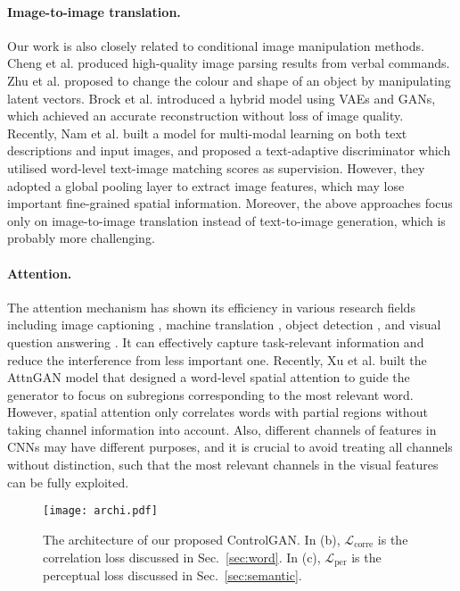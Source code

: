 \documentclass{article}
\begin{document}
\paragraph{Image-to-image translation.} Our work is also closely related to conditional image manipulation methods. Cheng et al. \cite{cheng2014imagespirit} produced high-quality image parsing results from verbal commands. Zhu et al. \cite{zhu2016generative} proposed to change the colour and shape of an object by manipulating latent vectors.
Brock et al. \cite{brock2016neural} introduced a hybrid model using VAEs \cite{kingma2014semi} and GANs, which achieved an accurate reconstruction without loss of {image quality}.
Recently, Nam et al. \cite{nam2018text} built a model for multi-modal learning on both text descriptions and input images, and proposed a text-adaptive discriminator which utilised word-level text-image matching scores as supervision.
However, they adopted a global pooling layer to extract image features, which may lose important fine-grained spatial information. Moreover, the above approaches focus only on image-to-image translation instead of text-to-image generation, which is {probably} more challenging.  
\paragraph{Attention.} The attention mechanism has shown its efficiency in various research fields including image captioning \cite{xu2015show, zhang2017mdnet}, machine translation \cite{bahdanau2014neural}, object detection \cite{oliva2003top, zhang2018progressive}, and visual question answering \cite{yang2016stacked}. 
It can effectively capture task-relevant information and reduce the interference from less important one.
Recently, Xu et al. \cite{xu2018attngan} built the AttnGAN model that designed a word-level spatial attention to guide the generator to focus on subregions corresponding to the most relevant word.
{However, spatial attention only correlates words with partial regions without taking channel information into account. Also, different channels of features in CNNs may have different purposes, and it is crucial to avoid treating all channels without distinction, such that the most relevant channels in the visual features can be fully exploited. }
\begin{figure}[t]
\centering
\begin{minipage}{1\textwidth}
\texttt{[image: archi.pdf]}
\end{minipage}
\caption{The architecture of our proposed ControlGAN. In (b), $\mathcal{L}_\text{corre}$ is the correlation loss discussed in Sec.~\ref{sec:word}. In (c), $\mathcal{L}_\text{per}$ is the perceptual loss discussed in Sec.~\ref{sec:semantic}.}
\label{fig:archi}
\end{figure}
\end{document}
